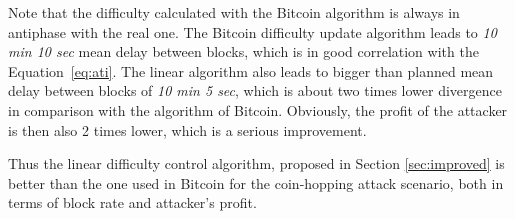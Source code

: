 \documentclass[]{llncs}
\newcommand{\attackname}{coin-hopping attack}
\begin{document}
Note that the difficulty calculated with the Bitcoin algorithm is always in antiphase with the real one.
The Bitcoin difficulty update algorithm leads to {\em 10 min 10 sec} mean delay between blocks, which is in good correlation with the Equation~\ref{eq:ati}.
The linear algorithm also leads to bigger than planned mean delay between blocks of {\em 10 min 5 sec}, which is about two times lower divergence in comparison with the algorithm of Bitcoin. Obviously, the profit of the attacker is then also 2 times lower, which is a serious improvement.

Thus the linear difficulty control algorithm, proposed in Section \ref{sec:improved} is better than the one used in Bitcoin for the \attackname{} scenario, both in terms of block rate and attacker's profit.








\end{document}
